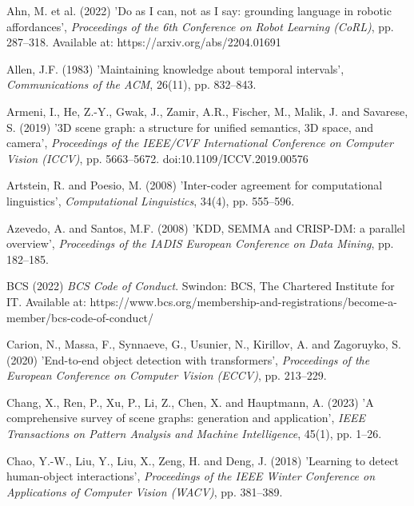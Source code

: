 \small
\begin{description}[leftmargin=2em, labelindent=0em, itemsep=0.1em, parsep=0pt, topsep=0.3em]
\item[] Ahn, M. et al. (2022) 'Do as I can, not as I say: grounding language in robotic affordances', \textit{Proceedings of the 6th Conference on Robot Learning (CoRL)}, pp. 287--318. Available at: https:/\allowbreak{}/\allowbreak{}arxiv.\allowbreak{}org/\allowbreak{}abs/\allowbreak{}2204.\allowbreak{}01691
\item[] Allen, J.F. (1983) 'Maintaining knowledge about temporal intervals', \textit{Communications of the ACM}, 26(11), pp. 832--843.
\item[] Armeni, I., He, Z.-Y., Gwak, J., Zamir, A.R., Fischer, M., Malik, J. and Savarese, S. (2019) '3D scene graph: a structure for unified semantics, 3D space, and camera', \textit{Proceedings of the IEEE/CVF International Conference on Computer Vision (ICCV)}, pp. 5663--5672. doi:10.1109/ICCV.2019.00576
\item[] Artstein, R. and Poesio, M. (2008) 'Inter-coder agreement for computational linguistics', \textit{Computational Linguistics}, 34(4), pp. 555--596.
\item[] Azevedo, A. and Santos, M.F. (2008) 'KDD, SEMMA and CRISP-DM: a parallel overview', \textit{Proceedings of the IADIS European Conference on Data Mining}, pp. 182--185.
\item[] BCS (2022) \textit{BCS Code of Conduct}. Swindon: BCS, The Chartered Institute for IT. Available at: https:/\allowbreak{}/\allowbreak{}www.\allowbreak{}bcs.\allowbreak{}org/\allowbreak{}membership-\allowbreak{}and-\allowbreak{}registrations/\allowbreak{}become-\allowbreak{}a-\allowbreak{}member/\allowbreak{}bcs-\allowbreak{}code-\allowbreak{}of-\allowbreak{}conduct/\allowbreak{}
\item[] Carion, N., Massa, F., Synnaeve, G., Usunier, N., Kirillov, A. and Zagoruyko, S. (2020) 'End-to-end object detection with transformers', \textit{Proceedings of the European Conference on Computer Vision (ECCV)}, pp. 213--229.
\item[] Chang, X., Ren, P., Xu, P., Li, Z., Chen, X. and Hauptmann, A. (2023) 'A comprehensive survey of scene graphs: generation and application', \textit{IEEE Transactions on Pattern Analysis and Machine Intelligence}, 45(1), pp. 1--26.
\item[] Chao, Y.-W., Liu, Y., Liu, X., Zeng, H. and Deng, J. (2018) 'Learning to detect human-object interactions', \textit{Proceedings of the IEEE Winter Conference on Applications of Computer Vision (WACV)}, pp. 381--389.

\end{description}
